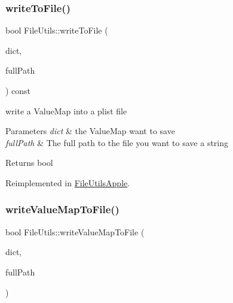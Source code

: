 \subsubsection{\texorpdfstring{write\+To\+File()}{writeToFile()}\hspace{0.1cm}{\footnotesize\ttfamily [2/2]}}
{\footnotesize\ttfamily bool File\+Utils\+::write\+To\+File (\begin{DoxyParamCaption}\item[{const Value\+Map \&}]{dict,  }\item[{const std\+::string \&}]{full\+Path }\end{DoxyParamCaption}) const\hspace{0.3cm}{\ttfamily [virtual]}}

write a Value\+Map into a plist file


\begin{DoxyParams}{Parameters}
{\em dict} & the Value\+Map want to save \\
\hline
{\em full\+Path} & The full path to the file you want to save a string \\
\hline
\end{DoxyParams}
\begin{DoxyReturn}{Returns}
bool 
\end{DoxyReturn}


Reimplemented in \hyperlink{classFileUtilsApple_a2c762108569f84b4db36ae6d6cb3760f}{File\+Utils\+Apple}.

\mbox{\label{classFileUtils_a3bfc1cbc320b69f8fd2581431f6362d1}} 
\subsubsection{\texorpdfstring{write\+Value\+Map\+To\+File()}{writeValueMapToFile()}\hspace{0.1cm}{\footnotesize\ttfamily [1/3]}}
{\footnotesize\ttfamily bool File\+Utils\+::write\+Value\+Map\+To\+File (\begin{DoxyParamCaption}\item[{const Value\+Map \&}]{dict,  }\item[{const std\+::string \&}]{full\+Path }\end{DoxyParamCaption})\hspace{0.3cm}{\ttfamily [virtual]}}

